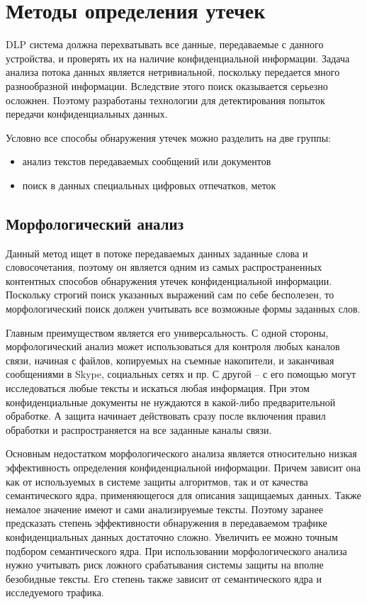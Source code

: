 \section{Методы определения утечек}

DLP система должна перехватывать все данные, передаваемые с данного устройства, и проверять их на наличие конфиденциальной информации. Задача анализа потока данных является нетривиальной, поскольку передается много разнообразной информации. Вследствие этого поиск оказывается серьезно осложнен. Поэтому разработаны технологии для детектирования попыток передачи конфиденциальных данных.

Условно все способы обнаружения утечек можно разделить на две группы:

\begin{itemize}
	\item
	    анализ текстов передаваемых сообщений или документов
	\item 
	    поиск в данных специальных цифровых отпечатков, меток	    
\end{itemize}


\subsection{Морфологический анализ}

Данный метод ищет в потоке передаваемых данных  заданные слова и словосочетания, поэтому он является одним из самых распространенных контентных способов обнаружения утечек конфиденциальной информации.  Поскольку строгий поиск указанных выражений сам по себе бесполезен, то морфологический поиск должен учитывать все возможные формы заданных слов.

Главным преимуществом является его универсальность. С одной стороны, морфологический анализ может использоваться для контроля любых каналов связи, начиная с файлов, копируемых на съемные накопители, и заканчивая сообщениями в Skype, социальных сетях и пр. С другой – с его помощью могут исследоваться любые тексты и искаться любая информация. При этом конфиденциальные документы не нуждаются в какой-либо предварительной обработке. А защита начинает действовать сразу после включения правил обработки и распространяется на все заданные каналы связи.

Основным недостатком морфологического анализа является относительно низкая эффективность определения конфиденциальной информации. Причем зависит она как от используемых в системе защиты алгоритмов, так и от качества семантического ядра, применяющегося для описания защищаемых данных. Также немалое значение имеют и сами анализируемые тексты. Поэтому заранее предсказать степень эффективности обнаружения в передаваемом трафике конфиденциальных данных достаточно сложно. Увеличить ее можно точным подбором семантического ядра. При использовании морфологического анализа нужно учитывать риск ложного срабатывания системы защиты на вполне безобидные тексты. Его степень также зависит от семантического ядра и исследуемого трафика.

